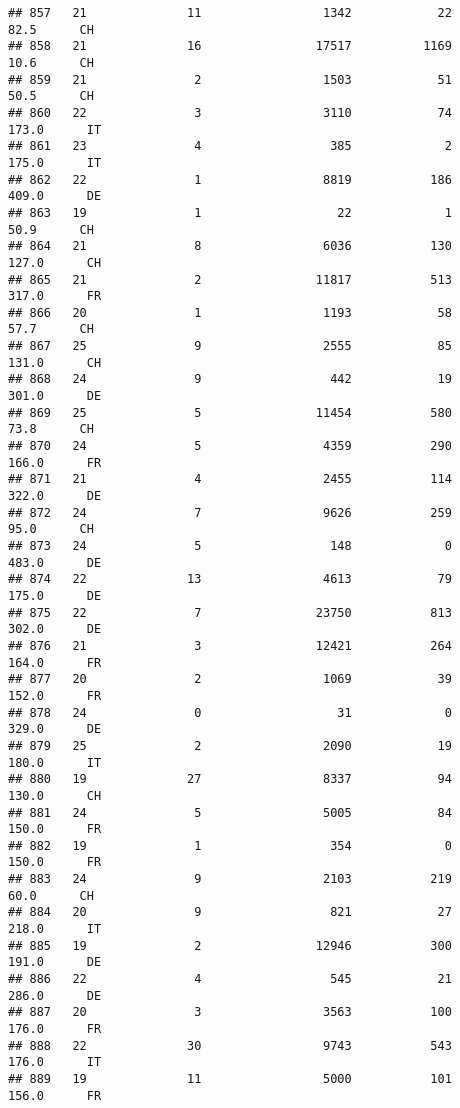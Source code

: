 \documentclass[
]{article}
\begin{document}
\begin{verbatim}
## 857   21              11                 1342            22     82.5      CH
## 858   21              16                17517          1169     10.6      CH
## 859   21               2                 1503            51     50.5      CH
## 860   22               3                 3110            74    173.0      IT
## 861   23               4                  385             2    175.0      IT
## 862   22               1                 8819           186    409.0      DE
## 863   19               1                   22             1     50.9      CH
## 864   21               8                 6036           130    127.0      CH
## 865   21               2                11817           513    317.0      FR
## 866   20               1                 1193            58     57.7      CH
## 867   25               9                 2555            85    131.0      CH
## 868   24               9                  442            19    301.0      DE
## 869   25               5                11454           580     73.8      CH
## 870   24               5                 4359           290    166.0      FR
## 871   21               4                 2455           114    322.0      DE
## 872   24               7                 9626           259     95.0      CH
## 873   24               5                  148             0    483.0      DE
## 874   22              13                 4613            79    175.0      DE
## 875   22               7                23750           813    302.0      DE
## 876   21               3                12421           264    164.0      FR
## 877   20               2                 1069            39    152.0      FR
## 878   24               0                   31             0    329.0      DE
## 879   25               2                 2090            19    180.0      IT
## 880   19              27                 8337            94    130.0      CH
## 881   24               5                 5005            84    150.0      FR
## 882   19               1                  354             0    150.0      FR
## 883   24               9                 2103           219     60.0      CH
## 884   20               9                  821            27    218.0      IT
## 885   19               2                12946           300    191.0      DE
## 886   22               4                  545            21    286.0      DE
## 887   20               3                 3563           100    176.0      FR
## 888   22              30                 9743           543    176.0      IT
## 889   19              11                 5000           101    156.0      FR

\end{verbatim}
\end{document}

